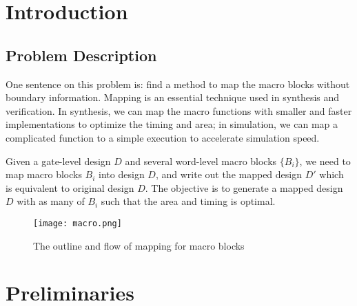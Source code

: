 \documentclass[conference,10pt]{IEEEtran}
\begin{document}
\section{Introduction}
\subsection{Problem Description}
One sentence on this problem is: find a method to map the macro blocks without boundary information.
Mapping is an essential technique used in synthesis and verification. In synthesis, we can map the 
macro functions with smaller and faster implementations to optimize the timing and area; in simulation,
we can map a complicated function to a simple execution to accelerate simulation speed.

Given a gate-level design $D$ and several word-level macro blocks $\{B_i\}$, we need to map macro
blocks $B_i$ into design $D$, and write out the mapped design $D'$ which is equivalent to original
design $D$. The objective is to generate a mapped design $D$ with as many of $B_i$ such that the area
and timing is optimal. 

\begin{figure}[hbt]
	\begin{center}
	\texttt{[image: macro.png]}
	\end{center}
	\caption{The outline and flow of mapping for macro blocks}
	\label{fig:macro}
\end{figure}

\section{Preliminaries}
\label{sec:intro}
\end{document}
